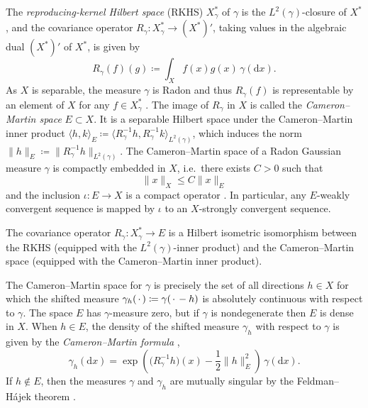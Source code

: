 \documentclass[11pt]{article}
\newcommand*{\defeq}{\coloneqq}
\newcommand*{\defterm}{\emph}%
\newcommand*{\quark}{\setbox0\hbox{$x$}\hbox to\wd0{\hss$\cdot$\hss}}
\newcommand*{\rd}{\mathrm{d}}
\renewcommand*{\leq}{\leqslant}
\theoremstyle{plain}
\theoremstyle{definition}
\newcommand{\innerprod}[2]{\langle #1 , #2 \rangle}
\newcommand{\norm}[1]{\lVert #1 \rVert}
\numberwithin{equation}{section}
\numberwithin{figure}{section}
\numberwithin{table}{section}
\begin{document}
The \defterm{reproducing-kernel Hilbert space} (RKHS) $X_{\gamma}^{\ast}$ of $\gamma$ is the $L^{2}(\gamma)$-closure of $X^{\ast}$, and the covariance operator $R_\gamma \colon X_\gamma^{\ast} \to (X^{\ast})'$, taking values in the algebraic dual $(X^{\ast})'$ of $X^{\ast}$, is given by
\begin{equation*}
	R_\gamma(f)(g) \defeq \int_X f(x) g(x) \,\gamma(\rd x).
\end{equation*}
As $X$ is separable, the measure $\gamma$ is Radon and thus $R_\gamma(f)$ is representable by an element of $X$ for any $f \in X^{\ast}_{\gamma}$ \citep[Theorem~3.2.3]{Bogachev1998}.
The image of $R_\gamma$ in $X$ is called the \defterm{Cameron--Martin space} $E \subset X$.
It is a separable Hilbert space under the Cameron--Martin inner product $\innerprod{h}{k}_E \defeq \innerprod{R_\gamma^{-1} h}{R_\gamma^{-1} k}_{L^2(\gamma)}$, which induces the norm $\norm{h}_{E} \defeq \norm{R_\gamma^{-1} h}_{L^{2}(\gamma)}$.
The Cameron--Martin space of a Radon Gaussian measure $\gamma$ is compactly embedded in $X$, i.e.\ there exists $C > 0$ such that 
\begin{equation} \label{eq:compact_embedding}
	\norm{x}_X \leq C \norm{x}_{E}
\end{equation}
and the inclusion $\iota \colon E \to X$ is a compact operator \citep[Corollary~3.2.4]{Bogachev1998}.
In particular, any $E$-weakly convergent sequence is mapped by $\iota$ to an $X$-strongly convergent sequence.

The covariance operator $R_\gamma \colon X_\gamma^{\ast} \to E$ is a Hilbert isometric isomorphism between the RKHS (equipped with the $L^2(\gamma)$-inner product) and the Cameron--Martin space (equipped with the Cameron--Martin inner product).

The Cameron--Martin space for $\gamma$ is precisely the set of all directions $h \in X$ for which the shifted measure $\gamma_h(\quark) \defeq \gamma(\quark - h)$ is absolutely continuous with respect to $\gamma$.
The space $E$ has $\gamma$-measure zero, but if $\gamma$ is nondegenerate then $E$ is dense in $X$.
When $h \in E$, the density of the shifted measure $\gamma_{h}$ with respect to $\gamma$ is given by the \defterm{Cameron--Martin formula} \citep[Corollary~2.4.3]{Bogachev1998},
\begin{equation} \label{eq:Cameron--Martin_formula}
	\gamma_h(\rd x) = \exp\left( \bigl(R_\gamma^{-1}h\bigr)(x) - \frac{1}{2}\norm{h}_{E}^{2} \right) \,\gamma(\rd x).
\end{equation}
If $h \notin E$, then the measures $\gamma$ and $\gamma_h$ are mutually singular by the Feldman--H\'ajek theorem \citep[Theorem~2.7.2]{Bogachev1998}.
\end{document}
